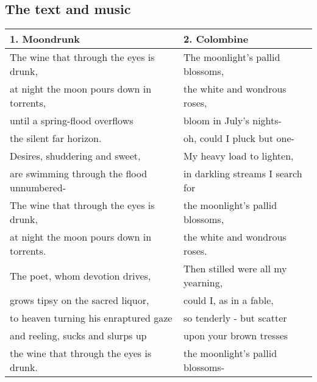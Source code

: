 \subsection{The text and music}
\begin{table}[h!]
\begin{tabular}{p{8.0cm}|p{8.0cm}} \hline

1. Moondrunk & 2. Colombine \\\hline
The wine that through the eyes is drunk, & The moonlight's pallid blossoms, \\ 
at night the moon pours down in torrents, & the white and wondrous roses, \\
until a spring-flood overflows & bloom in July's nights-\\
the silent far horizon. & oh, could I pluck but one-\\
Desires, shuddering and sweet, & My heavy load to lighten, \\
are swimming through the flood unnumbered- & in darkling streams I search for \\
The wine that through the eyes is drunk, & the moonlight's pallid blossoms,\\
at night the moon pours down in torrents.& the white and wondrous roses.\\ 
The poet, whom devotion drives, & Then stilled were all my yearning,\\
grows tipsy on the sacred liquor, & could I, as in a fable, \\
to heaven turning his enraptured gaze & so tenderly - but scatter \\
and reeling, sucks and slurps up & upon your brown tresses \\
the wine that through the eyes  is drunk.& the moonlight's pallid blossoms-\\\hline
 

\end{tabular}
\end{table}
